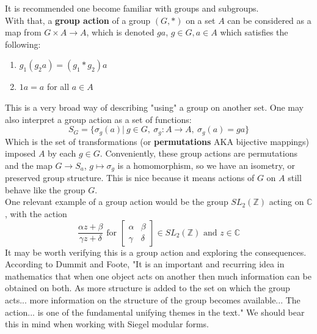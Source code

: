 \documentclass[11pt, oneside]{amsart}
\begin{document}
It is recommended one become familiar with groups and subgroups.\\
With that, a \textbf{group action} of a group $(G, *)$ on a set $A$ can be considered as a map from $G\times A \rightarrow A$, which is denoted $ga$, $g\in G, a\in A$ which satisfies the following:
\begin{enumerate}
\item $g_1(g_2a)=(g_1*g_2)a$
\item $1a=a$ for all $a\in A$
\end{enumerate}
This is a very broad way of describing "using" a group on another set. One may also interpret a group action as a set of functions:
$$S_{G} = \{\sigma_{g}(a)\vert\: g\in G,\:\sigma_{g}: A\rightarrow A,\:\sigma_{g}(a)=ga\}$$
Which is the set of transformations (or \textbf{permutations} AKA bijective mappings) imposed $A$ by each $g\in G$. Conveniently, these group actions are permutations and the map $G\rightarrow S_a$, $g\mapsto \sigma_g$ is a homomorphism, so we have an isometry, or preserved group structure. This is nice because it means actions of $G$ on $A$ still behave like the group $G$.\\
One relevant example of a group action would be the group $SL_2(\mathbb{Z})$ acting on $\mathbb{C}$, with the action $$ \frac{\alpha z + \beta}{\gamma z + \delta}
\text{ for } \begin{bmatrix}

\alpha &	\beta \\
\gamma & \delta

\end{bmatrix} \in SL_2(\mathbb{Z})\text{ and } z\in \mathbb{C}$$
It may be worth verifying this is a group action and exploring the consequences.\\
According to Dummit and Foote, "It is an important and recurring idea in mathematics that when one object acts on another then much information can be obtained on both. As more structure is added to the set on which the group acts... more information on the structure of the group becomes available... The action... is one of the fundamental unifying themes in the text." We should bear this in mind when working with Siegel modular forms.\\
\end{document}
